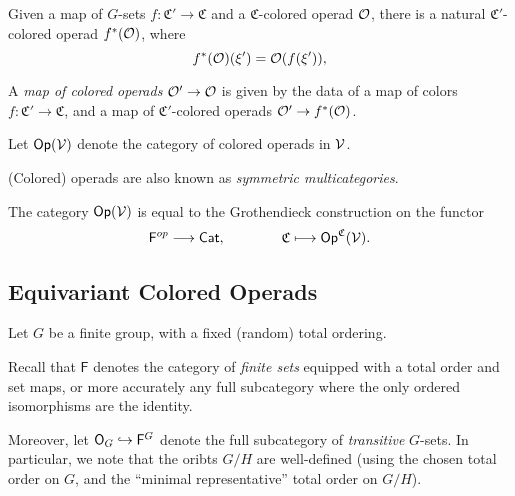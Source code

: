 \documentclass[a4paper,10pt
,draft
]{article}%
\renewcommand{\1}{\ensuremath{\mathbb{id}}}
\begin{document}
\begin{definition}
      \label{OP_MAP_DEFN}
      Given a map of $G$-sets $f: \mathfrak C' \to \mathfrak C$ and a $\mathfrak C$-colored operad $\mathcal{O}$,
      there is a natural $\mathfrak C'$-colored operad $f^*(\mathcal{O})$, where
      \begin{equation}
            f^{\**}(\O)(\xi') = \O(f(\xi')),
      \end{equation}

      A \textit{map of colored operads} $\mathcal{O}' \to \mathcal{O}$ is given by the data of a map of colors $f: \mathfrak C' \to \mathfrak C$,
      and a map of $\mathfrak C'$-colored operads $\mathcal{O}' \to f^*(\mathcal{O})$.
      
      Let $\mathsf{Op}(\mathcal V)$ denote the category of colored operads in $\mathcal V$.
\end{definition}

\begin{remark}
      (Colored) operads are also known as \textit{symmetric multicategories}.
\end{remark}

\begin{remark}
      The category $\mathsf{Op}(\mathcal V)$ is equal to the Grothendieck construction on the functor
      \begin{equation}
            \mathsf F^{op} \longrightarrow \mathsf{Cat},
            \qquad \qquad
            \mathfrak C \longmapsto \mathsf{Op}^{\mathfrak C}(\mathcal V).
      \end{equation}
\end{remark}




\subsection{Equivariant Colored Operads}

Let $G$ be a finite group, with a fixed (random) total ordering.
\begin{notation}
      [{cf. \cite{BP17}}]
      Recall that $\mathsf F$ denotes the category of \textit{finite sets} equipped with a total order and set maps,
      or more accurately any full subcategory where the only ordered isomorphisms are the identity.
      
      Moreover, let $\mathsf O_G \hookrightarrow \mathsf F^G$ denote the full subcategory of \textit{transitive} $G$-sets.
      In particular, we note that the oribts $G/H$ are well-defined (using the chosen total order on $G$,
      and the ``minimal representative'' total order on $G/H$).
\end{notation}
\end{document}
